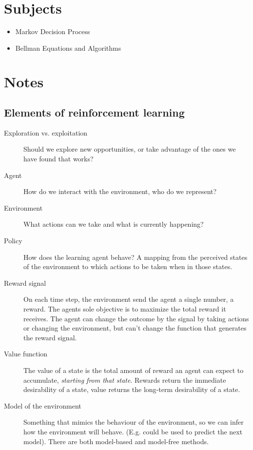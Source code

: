 


    \section{Subjects}
    \begin{itemize}
        \item Markov Decision Process
        \item Bellman Equations and Algorithms
    \end{itemize}
    
    \section{Notes}
    
    \subsection{Elements of reinforcement learning}

    \begin{description}
        \item[Exploration vs. exploitation] Should we explore new 
        opportunities, or take advantage of the ones we have found that works?
        \item[Agent] How do we interact with the environment, who do we 
        represent?
        \item[Environment] What actions can we take and what is currently 
        happening?
        \item[Policy] How does the learning agent behave? A mapping from the 
        perceived states of the environment to which actions to be taken when 
        in those states.
        \item[Reward signal] On each time step, the environment send the agent 
        a single number, a reward. The agents sole objective is to maximize the 
        total reward it receives. The agent can change the outcome by the 
        signal by taking actions or changing the environment, but can't change 
        the function that generates the reward signal.
        \item[Value function] The value of a state is the total amount of 
        reward an agent can expect to accumulate, \textit{starting from that 
        state}. Rewards return the immediate desirability of a state, value 
        returns the long-term desirability of a state.
        \item[Model of the environment] Something that mimics the behaviour of 
        the environment, so we can infer how the environment will behave. (E.g. 
        could be used to predict the next model). There are both model-based 
        and model-free methods.
    \end{description}
    
